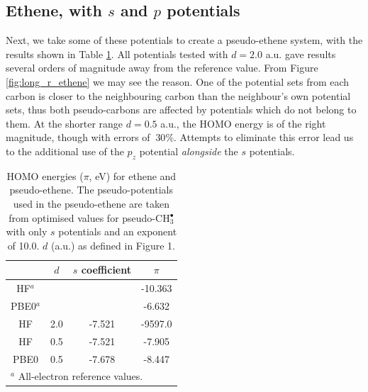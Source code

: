 \documentclass[aip]{revtex4-1}
\begin{document}
\subsection*{Ethene, with \(s\) and \(p\) potentials}

Next, we take some of these potentials to create a pseudo-ethene system, with the results shown in Table \ref{table:ethene_s_pseudo}. All potentials tested with \(d = 2.0\) a.u. gave results several orders of magnitude away from the reference value. From Figure \ref{fig:long_r_ethene} we may see the reason. One of the potential sets from each carbon is closer to the neighbouring carbon than the neighbour's own potential sets, thus both pseudo-carbons are affected by potentials which do not belong to them. At the shorter range \(d = 0.5\) a.u., the HOMO energy is of the right magnitude, though with errors of \(~ 30\%\). Attempts to eliminate this error lead us to the additional use of the \(p_{z}\) potential \textit{alongside} the \(s\) potentials.

\begin{table}[ht]
\caption{HOMO energies ($\pi$, eV) for ethene and pseudo-ethene. The pseudo-potentials used in the pseudo-ethene are taken from optimised values for 
pseudo-CH\(^{\bullet}_{3}\) with only \(s\) potentials and an exponent of 10.0. $d$ (a.u.) as defined 
in Figure 1.}
\label{table:ethene_s_pseudo}
\begin{tabular}{c c c c}
\hline\hline
& $d$ & \(s\) coefficient & \( \pi \)  \\
\hline
HF$^a$   &     &        & -10.363 \\
PBE0$^a$ &     &        & -6.632 \\
HF       & 2.0 & -7.521 & -9597.0 \\
HF       & 0.5 & -7.521  & -7.905 \\
PBE0     & 0.5 &-7.678  & -8.447 \\
\hline\hline
\multicolumn{4}{l}{$^a$ All-electron reference values.}\\
\end{tabular}
\end{table}
\end{document}

